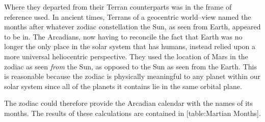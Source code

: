 Where they departed from their Terran counterparts was in the frame of reference used. In ancient times, Terrans of a geocentric world--view named the months after whatever zodiac constellation the Sun, as seen from Earth, appeared to be in. The Arcadians, now having to reconcile the fact that Earth was no longer the only place in the solar system that has humans, instead relied upon a more universal heliocentric perspective. They used the location of Mars in the zodiac as seen {\it from} the Sun, as opposed to the Sun as seen from the Earth. This is reasonable because the zodiac is physically meaningful to any planet within our solar system since all of the planets it contains lie in the same orbital plane. 

The zodiac could therefore provide the Arcadian calendar with the names of its months. The results of these calculations are contained in [table:Martian Months].
\crlf

